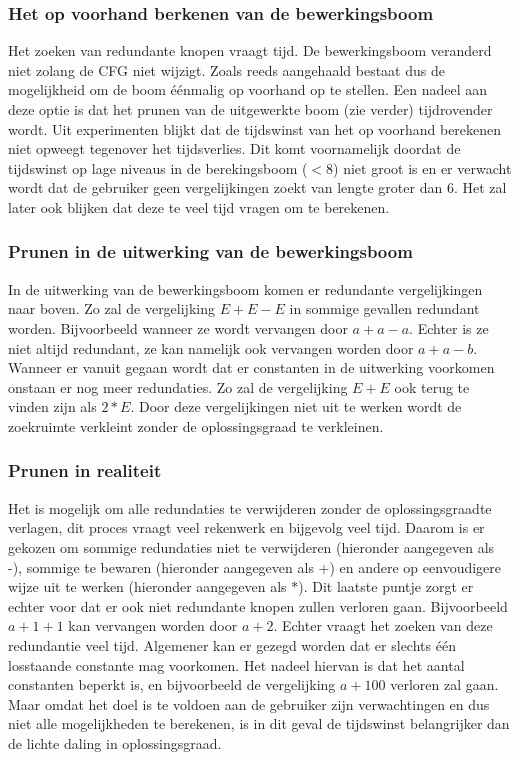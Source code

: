 \documentclass[Main.tex]{subfiles}
\begin{document}
\subsubsection*{Het op voorhand berkenen van de bewerkingsboom}
Het zoeken van redundante knopen vraagt tijd. De bewerkingsboom veranderd niet zolang de CFG niet wijzigt. Zoals reeds aangehaald bestaat dus de mogelijkheid om de boom \'e\'enmalig op voorhand op te stellen. Een nadeel aan deze optie is dat het prunen van de uitgewerkte boom (zie verder) tijdrovender wordt. Uit experimenten blijkt dat de tijdswinst van het op voorhand berekenen niet opweegt tegenover het tijdsverlies. Dit komt voornamelijk doordat de tijdswinst op lage niveaus in de berekingsboom ($< 8$) niet groot is en er verwacht wordt dat de gebruiker geen vergelijkingen zoekt van lengte groter dan 6. Het zal later ook blijken dat deze te veel tijd vragen om te berekenen. 

\subsubsection*{Prunen in de uitwerking van de bewerkingsboom}
In de uitwerking van de bewerkingsboom komen er redundante vergelijkingen naar boven. Zo zal de vergelijking $E+E-E$ in sommige gevallen redundant worden. Bijvoorbeeld wanneer ze wordt vervangen door $a+a-a$. Echter is ze niet altijd redundant, ze kan namelijk ook vervangen worden door $a+a-b$. Wanneer er vanuit gegaan wordt dat er constanten in de uitwerking voorkomen onstaan er nog meer redundaties. Zo zal de vergelijking $E+E$ ook terug te vinden zijn als $2*E$. Door deze vergelijkingen niet uit te werken wordt de zoekruimte verkleint zonder de oplossingsgraad te verkleinen.

\subsubsection*{Prunen in realiteit}
Het is mogelijk om alle redundaties te verwijderen zonder de oplossingsgraad\footnotemark[\ref{note:oplossingsgraad}] te verlagen, dit proces vraagt veel rekenwerk en bijgevolg veel tijd. Daarom is er gekozen om sommige redundaties niet te verwijderen (hieronder aangegeven als -), sommige te bewaren (hieronder aangegeven als +) en andere op eenvoudigere wijze uit te werken (hieronder aangegeven als $\ast$). Dit laatste puntje zorgt er echter voor dat er ook niet redundante knopen zullen verloren gaan. Bijvoorbeeld $a+1+1$ kan vervangen worden door $a+2$. Echter vraagt het zoeken van deze redundantie veel tijd. Algemener kan er gezegd worden dat er slechts \'e\'en losstaande constante mag voorkomen. Het nadeel hiervan is dat het aantal constanten beperkt is, en bijvoorbeeld de vergelijking $a+100$ verloren zal gaan. Maar omdat het doel is te voldoen aan de gebruiker zijn verwachtingen en dus niet alle mogelijkheden te berekenen, is in dit geval de tijdswinst belangrijker dan de lichte daling in oplossingsgraad\footnotemark[\ref{note:oplossingsgraad}].
\end{document}
